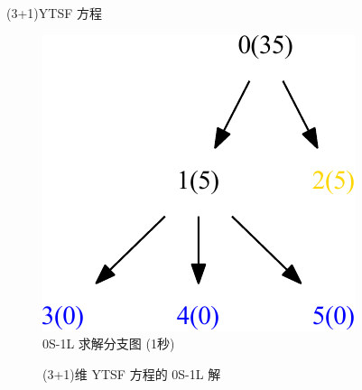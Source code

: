 \documentclass{beamer}
\begin{document}
\begin{frame}
(3+1)YTSF 方程
\begin{figure}
\centering
\includegraphics[width=.5\textwidth]{../paper/fig/0S1L.pdf}
\caption{0S-1L 求解分支图 (1秒)}
\end{figure}
\end{frame}

\begin{frame}
\begin{figure}
\centering
\setcounter{subfigure}{0}
\caption{(3+1)维 YTSF 方程的 0S-1L 解}
\end{figure}
\end{frame}
\end{document}
